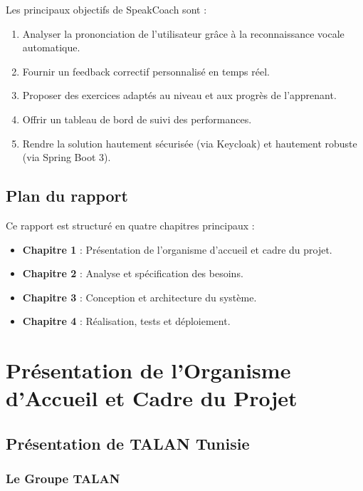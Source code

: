 \documentclass[12pt,a4paper]{report}
\begin{document}
Les principaux objectifs de SpeakCoach sont :

\begin{enumerate}[leftmargin=2cm]
    \item Analyser la prononciation de l'utilisateur grâce à la reconnaissance vocale automatique.
    \item Fournir un feedback correctif personnalisé en temps réel.
    \item Proposer des exercices adaptés au niveau et aux progrès de l'apprenant.
    \item Offrir un tableau de bord de suivi des performances.
    \item Rendre la solution hautement sécurisée (via Keycloak) et hautement robuste (via Spring Boot 3).
\end{enumerate}

\section{Plan du rapport}

Ce rapport est structuré en quatre chapitres principaux :

\begin{itemize}[leftmargin=2cm]
    \item \textbf{Chapitre 1} : Présentation de l'organisme d'accueil et cadre du projet.
    \item \textbf{Chapitre 2} : Analyse et spécification des besoins.
    \item \textbf{Chapitre 3} : Conception et architecture du système.
    \item \textbf{Chapitre 4} : Réalisation, tests et déploiement.
\end{itemize}

\chapter{Présentation de l'Organisme d'Accueil et Cadre du Projet}

\section{Présentation de TALAN Tunisie}

\subsection{Le Groupe TALAN}
\end{document}
